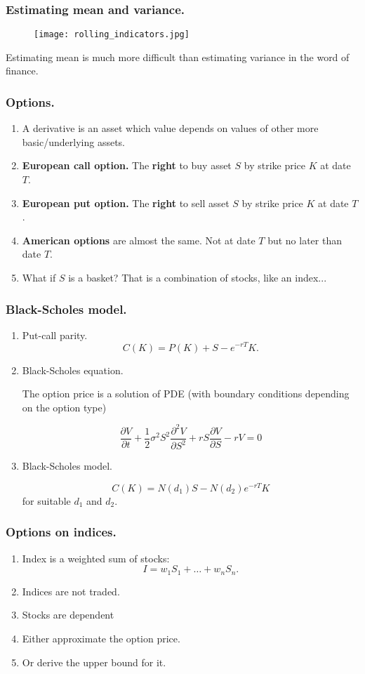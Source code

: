 \documentclass{beamer}
\begin{document}
\begin{frame}[fragile]
\frametitle{Estimating mean and variance.}
\begin{figure}[h!]
\centering
\texttt{[image: rolling\_indicators.jpg]}
\end{figure}
Estimating mean is much more difficult than estimating variance in the word of finance.
\end{frame}
\begin{frame}[fragile]
\frametitle{Options.}
\begin{enumerate}
	\item A derivative is an asset which value depends on values of other more basic/underlying assets.
	\item \textbf{European call option.} The \textbf{right} to buy asset $S$ by strike price $K$ at date $T$. 
	\item \textbf{European put option.} The \textbf{right} to sell asset $S$ by strike price $K$ at date $T$.
	\item \textbf{American options} are almost the same. Not at date $T$ but no later than date $T$.
	\item What if $S$ is a basket? That is a combination of stocks, like an index...
\end{enumerate}
\end{frame}
\begin{frame}
\frametitle{Black-Scholes model.}
\begin{enumerate}
\item Put-call parity.
$$C(K) = P(K) + S - e^{-rT}K.$$
\item Black-Scholes equation.

The option price is a solution of PDE (with boundary conditions depending on the option type)

$$\frac{\partial V}{\partial t} + \frac{1}{2}\sigma^2S^2\frac{\partial^2 V}{\partial S^2}
+ rS\frac{\partial V}{\partial S} - rV=0$$

\item Black-Scholes model.

$$C(K) = N(d_1)S - N(d_2)e^{-rT}K$$
for suitable $d_1$ and $d_2$.
\end{enumerate}
\end{frame}
\begin{frame}
\frametitle{Options on indices.}
\begin{enumerate}
	\item Index is a weighted sum of stocks:
	$$I = w_1S_1 + \ldots + w_n S_n.$$
	\item Indices are not traded.
	\item Stocks are dependent
	\item Either approximate the option price.
	\item Or derive the upper bound for it.
\end{enumerate}
\end{frame}
\end{document}
